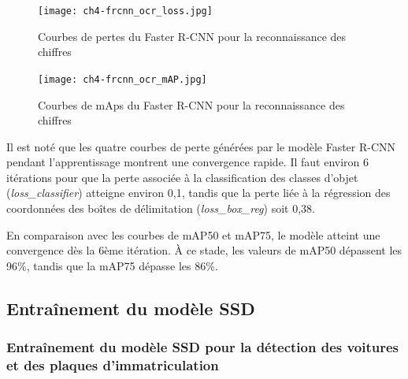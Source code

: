 \begin{figure}[H]
	\centering
	\texttt{[image: ch4-frcnn\_ocr\_loss.jpg]}
	\caption{Courbes de pertes du Faster R-CNN pour la reconnaissance des chiffres}
\label{fig:ch4-frcnn_ocr_loss}
\end{figure}

\begin{figure}[H]
	\centering
	\texttt{[image: ch4-frcnn\_ocr\_mAP.jpg]}
	\caption{Courbes de mAps du Faster R-CNN pour la reconnaissance des chiffres}
\label{fig:ch4-frcnn_ocr_mAP}
\end{figure}





Il est noté que les quatre courbes de perte générées par le modèle Faster R-CNN pendant l'apprentissage montrent une convergence rapide. Il faut environ 6 itérations pour que la perte associée à la classification des classes d'objet (\textit{loss\_classifier}) atteigne environ 0,1, tandis que la perte liée à la régression des coordonnées des boîtes de délimitation (\textit{loss\_box\_reg}) soit 0,38.

En comparaison avec les courbes de mAP50 et mAP75, le modèle atteint une convergence dès la 6ème itération. À ce stade, les valeurs de mAP50 dépassent les 96\%, tandis que la mAP75 dépasse les 86\%.

 
\subsection{Entraînement du modèle SSD}
\subsubsection{ Entraînement du modèle SSD pour la détection des voitures et des plaques d'immatriculation}

